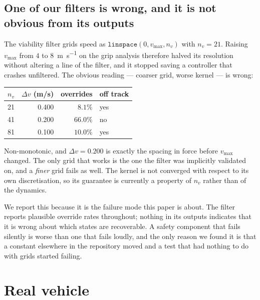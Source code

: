 \documentclass[letterpaper, 10 pt, conference]{ieeeconf}
\begin{document}
\subsection{One of our filters is wrong, and it is not obvious from its
outputs}\label{sec:viability}
The viability filter grids speed as $\texttt{linspace}(0, v_{\max}, n_v)$ with
$n_v = 21$. Raising $v_{\max}$ from $4$ to \SI{8}{\meter\per\second} on the
grip analysis therefore halved its resolution without altering a line of the
filter, and it stopped saving a controller that crashes unfiltered. The obvious
reading --- coarser grid, worse kernel --- is wrong:

\begin{center}
\begin{tabular}{rrrl}
  \toprule
  $n_v$ & $\Delta v$ (m/s) & overrides & off track \\
  \midrule
  21 & 0.400 & $8.1\%$  & yes \\
  41 & 0.200 & $66.0\%$ & no  \\
  81 & 0.100 & $10.0\%$ & yes \\
  \bottomrule
\end{tabular}
\end{center}

Non-monotonic, and $\Delta v = 0.200$ is exactly the spacing in force before
$v_{\max}$ changed. The only grid that works is the one the filter was
implicitly validated on, and a \emph{finer} grid fails as well. The kernel is
not converged with respect to its own discretisation, so its guarantee is
currently a property of $n_v$ rather than of the dynamics.

We report this because it is the failure mode this paper is about. The filter
reports plausible override rates throughout; nothing in its outputs indicates
that it is wrong about which states are recoverable. A safety component that
fails silently is worse than one that fails loudly, and the only reason we
found it is that a constant elsewhere in the repository moved and a test that
had nothing to do with grids started failing.

\section{Real vehicle}\label{sec:real}
\end{document}

